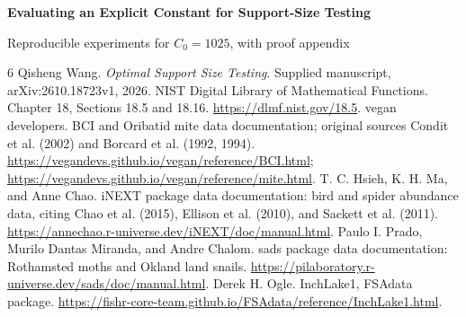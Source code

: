 \documentclass[10pt]{article}
\begin{document}
\begin{center}{\Large\bfseries Evaluating an Explicit Constant for Support-Size Testing\par}\vspace{.4em}
{\normalsize Reproducible experiments for $C_0=1025$, with proof appendix}\end{center}

\clearpage
\begin{thebibliography}{6}
 Qisheng Wang. \emph{Optimal Support Size Testing}. Supplied manuscript, arXiv:2610.18723v1, 2026.
 NIST Digital Library of Mathematical Functions. Chapter 18, Sections 18.5 and 18.16. \url{https://dlmf.nist.gov/18.5}.
 vegan developers. BCI and Oribatid mite data documentation; original sources Condit et al. (2002) and Borcard et al. (1992, 1994). \url{https://vegandevs.github.io/vegan/reference/BCI.html}; \url{https://vegandevs.github.io/vegan/reference/mite.html}.
 T. C. Hsieh, K. H. Ma, and Anne Chao. iNEXT package data documentation: bird and spider abundance data, citing Chao et al. (2015), Ellison et al. (2010), and Sackett et al. (2011). \url{https://annechao.r-universe.dev/iNEXT/doc/manual.html}.
 Paulo I. Prado, Murilo Dantas Miranda, and Andre Chalom. sads package data documentation: Rothamsted moths and Okland land snails. \url{https://pilaboratory.r-universe.dev/sads/doc/manual.html}.
 Derek H. Ogle. InchLake1, FSAdata package. \url{https://fishr-core-team.github.io/FSAdata/reference/InchLake1.html}.
\end{thebibliography}
\end{document}
